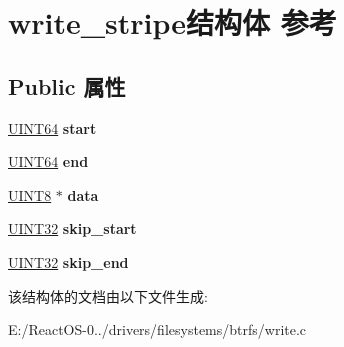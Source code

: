 \hypertarget{structwrite__stripe}{}\section{write\+\_\+stripe结构体 参考}
\label{structwrite__stripe}
\subsection*{Public 属性}
\begin{DoxyCompactItemize}
\item 
\mbox{\label{structwrite__stripe_abbb172b03ead3b11459772b169e15598}} 
\hyperlink{_processor_bind_8h_a57be03562867144161c1bfee95ca8f7c}{U\+I\+N\+T64} {\bfseries start}
\item 
\mbox{\label{structwrite__stripe_af1a4cde8c66c06300542530c35c281f8}} 
\hyperlink{_processor_bind_8h_a57be03562867144161c1bfee95ca8f7c}{U\+I\+N\+T64} {\bfseries end}
\item 
\mbox{\label{structwrite__stripe_ab49970c2effb01b80c0d26289af07f62}} 
\hyperlink{_processor_bind_8h_ab27e9918b538ce9d8ca692479b375b6a}{U\+I\+N\+T8} $\ast$ {\bfseries data}
\item 
\mbox{\label{structwrite__stripe_a29dae8b7e5a03e0e6abc901e2723fcb0}} 
\hyperlink{_processor_bind_8h_ae1e6edbbc26d6fbc71a90190d0266018}{U\+I\+N\+T32} {\bfseries skip\+\_\+start}
\item 
\mbox{\label{structwrite__stripe_a43cac53531bc3934f6fc4b17e55eae07}} 
\hyperlink{_processor_bind_8h_ae1e6edbbc26d6fbc71a90190d0266018}{U\+I\+N\+T32} {\bfseries skip\+\_\+end}
\end{DoxyCompactItemize}


该结构体的文档由以下文件生成\+:\begin{DoxyCompactItemize}
\item 
E\+:/\+React\+O\+S-\/0../drivers/filesystems/btrfs/write.\+c\end{DoxyCompactItemize}
